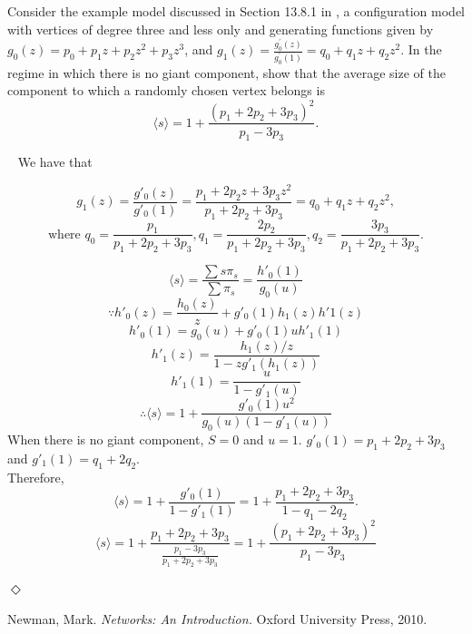 \documentclass[12pt]{article}
\newcommand {\bsolution}{\noindent {\em Solution:} \ }
\newcommand{\esolution}{\hfill $\Diamond$ \\ \vspace{.3cm}}
\begin{document}
 Consider the example model discussed in Section 13.8.1 in \cite{newman2010networks}, a configuration model with vertices of degree three and less only and generating functions given by $g_0(z) = p_0 +p_1z +p_2z^2 +p_3z^3$, and $g_1(z) =\frac{g_0^{\prime}(z)}{g_0^{\prime}(1)} = q_0 +q_1z +q_2z^2$. In the regime in which there is no giant component, show that the average size of the component to which a randomly chosen vertex belongs is $$\langle s \rangle=1+\frac{(p_1+2p_2+3p_3)^2}{p_1-3p_3}\text{.}$$

\newpage
\bsolution
We have that

	$$g_1(z)=\frac{g'_0(z)}{g'_0(1)}=\frac{p_1+2p_2z+3p_3z^2}{p_1+2p_2+3p_3}=q_0+q_1z+q_2z^2,$$
	$$\text{where }q_0=\frac{p_1}{p_1+2p_2+3p_3}, q_1=\frac{2p_2}{p_1+2p_2+3p_3}, q_2=\frac{3p_3}{p_1+2p_2+3p_3} \text{.}$$

	$$ \langle s \rangle=\frac{\sum s\pi_s}{\sum \pi_s}=\frac{h'_0(1)}{g_0(u)}$$
	$$ \because h'_0(z)=\frac{h_0(z)}{z}+g'_0(1)h_1(z)h'1(z) $$
	$$ h'_0(1)=g_0(u)+g'_0(1)uh'_1(1) $$
	$$ h'_1(z)=\frac{h_1(z)/z}{1-zg'_1(h_1(z))} $$
	$$ h'_1(1)=\frac{u}{1-g'_1(u)} $$
	$$ \therefore\langle s \rangle=1+\frac{g'_0(1)u^2}{g_0(u)(1-g'_1(u))} $$
	When there is no giant component, $S=0$ and $u=1$. $g'_0(1)=p_1+2p_2+3p_3$ and $g'_1(1)=q_1+2q_2$.\\
	Therefore, $$ \langle s \rangle=1+\frac{g'_0(1)}{1-g'_1(1)}=1+\frac{p_1+2p_2+3p_3}{1-q_1-2q_2}\text{.}$$
	$$ \langle s \rangle=1+\frac{p_1+2p_2+3p_3}{\frac{p_1-3p_3}{p_1+2p_2+3p_3}}=1+\frac{(p_1+2p_2+3p_3)^2}{p_1-3p_3} $$
	
\esolution


\begin{thebibliography}{9}
 Newman, Mark. \emph{Networks: An Introduction.} Oxford University Press, 2010.
\end{thebibliography}
\end{document}
